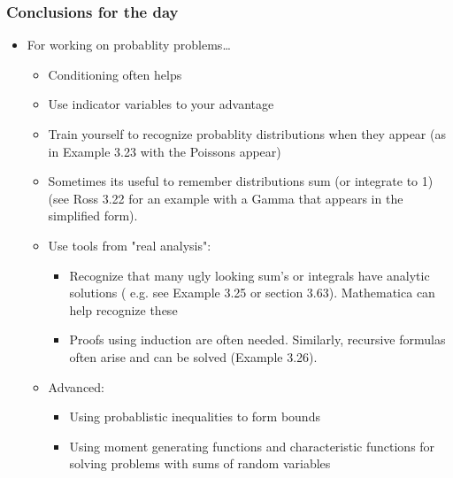 \documentclass[10pt,containsverbatim,paralist]{article}
\begin{document}
\subsubsection*{Conclusions for the day}
\label{sec-1-1-8}
\begin{itemize}
\item For working on probablity problems\ldots{}
\label{sec-1-1-8-1}
\begin{itemize}
\item Conditioning often helps
\label{sec-1-1-8-1-1}
\item Use indicator variables to your advantage
\label{sec-1-1-8-1-2}
\item Train yourself to recognize probablity distributions when they appear (as in Example 3.23 with the Poissons appear)
\label{sec-1-1-8-1-3}
\item Sometimes its useful to remember distributions sum (or integrate to 1) (see Ross 3.22 for an example with a Gamma that appears in the simplified form).
\label{sec-1-1-8-1-4}
\item Use tools from "real analysis":
\label{sec-1-1-8-1-5}
\begin{itemize}
\item Recognize that many ugly looking sum's or integrals have analytic solutions ( e.g. see Example 3.25 or section 3.63). Mathematica can help recognize these
\label{sec-1-1-8-1-5-1}
\item Proofs using induction are often needed.  Similarly, recursive formulas often arise and can be solved (Example 3.26).
\label{sec-1-1-8-1-5-2}
\end{itemize}
\item Advanced:
\label{sec-1-1-8-1-6}
\begin{itemize}
\item Using probablistic inequalities to form bounds
\item Using moment generating functions and characteristic functions for solving
problems with sums of random variables
\end{itemize}
\end{itemize}
\end{itemize}
\end{document}
